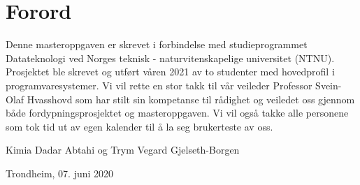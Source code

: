 \chapter*{Forord}
Denne masteroppgaven er skrevet i forbindelse med studieprogrammet Datateknologi ved Norges teknisk - naturvitenskapelige universitet (NTNU). Prosjektet ble skrevet og utført våren 2021 av to studenter med hovedprofil i programvaresystemer.
\newline
\newline
\noindent
Vi vil rette en stor takk til vår veileder Professor Svein-Olaf Hvasshovd som har stilt sin kompetanse til rådighet og veiledet oss gjennom både fordypningsprosjektet og masteroppgaven. Vi vil også takke alle personene som tok tid ut av egen kalender til å la seg brukerteste av oss.
\newline
\newline
\newline
\newline
\newline
\newline
\begin{flushright}
Kimia Dadar Abtahi og Trym Vegard Gjelseth-Borgen
\end{flushright}
\begin{flushright}
Trondheim, 07. juni 2020 
\end{flushright}